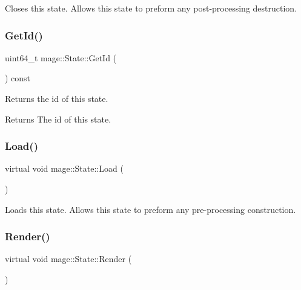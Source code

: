 Closes this state. Allows this state to preform any post-\/processing destruction. \hypertarget{classmage_1_1_state_a07c383a809204ba12a2bbfb22d2977d5}{}\label{classmage_1_1_state_a07c383a809204ba12a2bbfb22d2977d5} 
\subsubsection{\texorpdfstring{Get\+Id()}{GetId()}}
{\footnotesize\ttfamily uint64\+\_\+t mage\+::\+State\+::\+Get\+Id (\begin{DoxyParamCaption}{ }\end{DoxyParamCaption}) const}

Returns the id of this state.

\begin{DoxyReturn}{Returns}
The id of this state. 
\end{DoxyReturn}
\hypertarget{classmage_1_1_state_aa88ace504c82ad372e5e599746f3ebda}{}\label{classmage_1_1_state_aa88ace504c82ad372e5e599746f3ebda} 
\subsubsection{\texorpdfstring{Load()}{Load()}}
{\footnotesize\ttfamily virtual void mage\+::\+State\+::\+Load (\begin{DoxyParamCaption}{ }\end{DoxyParamCaption})\hspace{0.3cm}{\ttfamily [virtual]}}

Loads this state. Allows this state to preform any pre-\/processing construction. \hypertarget{classmage_1_1_state_a6e3b3f55bfd5be86a02783a2f76c9709}{}\label{classmage_1_1_state_a6e3b3f55bfd5be86a02783a2f76c9709} 
\subsubsection{\texorpdfstring{Render()}{Render()}}
{\footnotesize\ttfamily virtual void mage\+::\+State\+::\+Render (\begin{DoxyParamCaption}{ }\end{DoxyParamCaption})\hspace{0.3cm}{\ttfamily [virtual]}}


